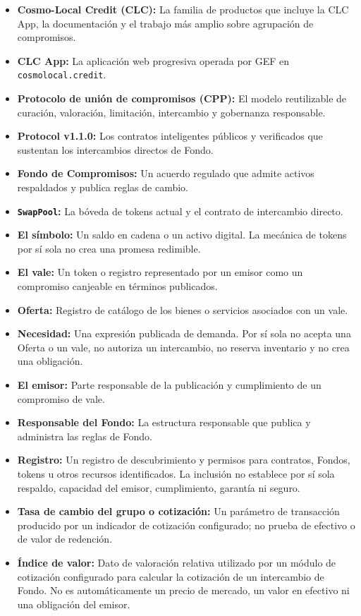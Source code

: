 \documentclass[11pt]{article}
\begin{document}
\begin{itemize}[leftmargin=*]
\item \textbf{Cosmo-Local Credit (CLC):} La familia de productos que incluye la CLC App, la documentación y el trabajo más amplio sobre agrupación de compromisos.
\item \textbf{CLC App:} La aplicación web progresiva operada por GEF en \texttt{cosmolocal.credit}.
\item \textbf{Protocolo de unión de compromisos (CPP):} El modelo reutilizable de curación, valoración, limitación, intercambio y gobernanza responsable.
\item \textbf{Protocol v1.1.0:} Los contratos inteligentes públicos y verificados que sustentan los intercambios directos de Fondo.
\item \textbf{Fondo de Compromisos:} Un acuerdo regulado que admite activos respaldados y publica reglas de cambio.
\item \textbf{\texttt{SwapPool}:} La bóveda de tokens actual y el contrato de intercambio directo.
\item \textbf{El símbolo:} Un saldo en cadena o un activo digital. La mecánica de tokens por sí sola no crea una promesa redimible.
\item \textbf{El vale:} Un token o registro representado por un emisor como un compromiso canjeable en términos publicados.
\item \textbf{Oferta:} Registro de catálogo de los bienes o servicios asociados con un vale.
\item \textbf{Necesidad:} Una expresión publicada de demanda. Por sí sola no acepta una Oferta o un vale, no autoriza un intercambio, no reserva inventario y no crea una obligación.
\item \textbf{El emisor:} Parte responsable de la publicación y cumplimiento de un compromiso de vale.
\item \textbf{Responsable del Fondo:} La estructura responsable que publica y administra las reglas de Fondo.
\item \textbf{Registro:} Un registro de descubrimiento y permisos para contratos, Fondos, tokens u otros recursos identificados. La inclusión no establece por sí sola respaldo, capacidad del emisor, cumplimiento, garantía ni seguro.
\item \textbf{Tasa de cambio del grupo o cotización:} Un parámetro de transacción producido por un indicador de cotización configurado; no prueba de efectivo o de valor de redención.
\item \textbf{Índice de valor:} Dato de valoración relativa utilizado por un módulo de cotización configurado para calcular la cotización de un intercambio de Fondo. No es automáticamente un precio de mercado, un valor en efectivo ni una obligación del emisor.

\end{itemize}
\end{document}
